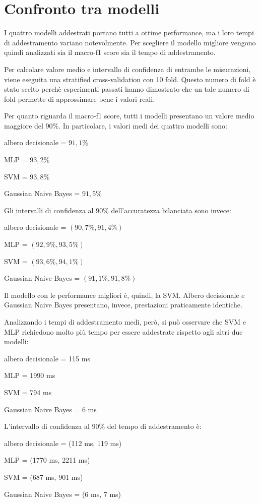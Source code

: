 \section{Confronto tra modelli}
I quattro modelli addestrati portano tutti a ottime performance, ma i loro 
tempi di addestramento variano notevolmente.
Per scegliere il modello migliore vengono quindi analizzati sia il macro-f1 score
sia il tempo di addestramento.

Per calcolare valore medio e intervallo di confidenza di entrambe
le misurazioni, viene eseguita
una stratified cross-validation con 10 fold. Questo numero di fold è stato 
scelto perchè esperimenti passati hanno dimostrato che un tale numero di fold
permette di approssimare bene i valori reali.

Per quanto riguarda il macro-f1 score, tutti i modelli presentano un
valore medio maggiore del $90\%$. In particolare, i valori medi dei quattro modelli
sono: \begin{itemize*}
    \item albero decisionale = $91,1\%$
    \item MLP = $93,2\%$
    \item SVM = $93,8\%$
    \item Gaussian Naive Bayes = $91,5\%$
\end{itemize*}
Gli intervalli di confidenza al $90\%$ dell'accuratezza bilanciata sono invece:
\begin{itemize*}
    \item albero decisionale = $(90,7\%, 91,4\%)$
    \item MLP = $(92,9\%, 93,5\%)$
    \item SVM = $(93,6\%, 94,1\%)$
    \item Gaussian Naive Bayes = $(91,1\%, 91,8\%)$
\end{itemize*}
Il modello con le performance migliori è, quindi, la SVM. Albero decisionale e
Gaussian Naive Bayes presentano, invece, prestazioni praticamente identiche.

Analizzando i tempi di addestramento medi, però, si può osservare che
SVM e MLP richiedono molto più tempo per essere addestrate rispetto
agli altri due modelli: \begin{itemize*}
    \item albero decisionale = 115 ms
    \item MLP = 1990 ms
    \item SVM = 794 ms
    \item Gaussian Naive Bayes = 6 ms
\end{itemize*}
L'intervallo di confidenza al $90\%$ del tempo di addestramento è: \begin{itemize*}
    \item albero decisionale = (112 ms, 119 ms)
    \item MLP = (1770 ms, 2211 ms)
    \item SVM = (687 ms, 901 ms)
    \item Gaussian Naive Bayes = (6 ms, 7 ms)
\end{itemize*}

